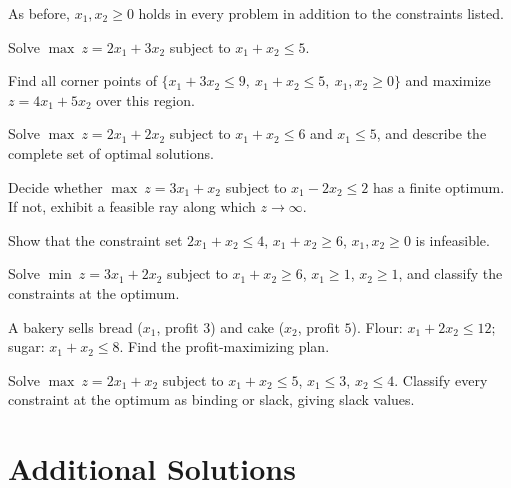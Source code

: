 As before, $x_{1},x_{2}\ge 0$ holds in every problem in addition to the
constraints listed.

\begin{problems}
  \item Solve $\max\ z=2x_{1}+3x_{2}$ subject to $x_{1}+x_{2}\le 5$.
  \item Find all corner points of
        $\{x_{1}+3x_{2}\le 9,\ x_{1}+x_{2}\le 5,\ x_{1},x_{2}\ge 0\}$ and
        maximize $z=4x_{1}+5x_{2}$ over this region.
  \item Solve $\max\ z=2x_{1}+2x_{2}$ subject to $x_{1}+x_{2}\le 6$ and
        $x_{1}\le 5$, and describe the complete set of optimal solutions.
  \item Decide whether $\max\ z=3x_{1}+x_{2}$ subject to
        $x_{1}-2x_{2}\le 2$ has a finite optimum. If not, exhibit a
        feasible ray along which $z\to\infty$.
  \item Show that the constraint set $2x_{1}+x_{2}\le 4$,
        $x_{1}+x_{2}\ge 6$, $x_{1},x_{2}\ge 0$ is infeasible.
  \item Solve $\min\ z=3x_{1}+2x_{2}$ subject to $x_{1}+x_{2}\ge 6$,
        $x_{1}\ge 1$, $x_{2}\ge 1$, and classify the constraints at the
        optimum.
  \item A bakery sells bread ($x_{1}$, profit $3$) and cake ($x_{2}$,
        profit $5$). Flour: $x_{1}+2x_{2}\le 12$; sugar:
        $x_{1}+x_{2}\le 8$. Find the profit-maximizing plan.
  \item Solve $\max\ z=2x_{1}+x_{2}$ subject to $x_{1}+x_{2}\le 5$,
        $x_{1}\le 3$, $x_{2}\le 4$. Classify every constraint at the
        optimum as binding or slack, giving slack values.
\end{problems}

\section{Additional Solutions}

